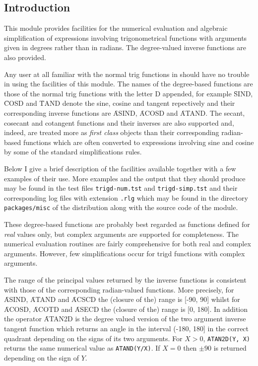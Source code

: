 
 
\subsection{Introduction}
This module provides facilities for the numerical evaluation and algebraic simplification of expressions involving  trigonometrical functions with arguments given in degrees rather than in radians.  The degree-valued inverse functions are also provided.  

Any user at all familiar with the normal trig functions in {\REDUCE} should have no trouble in using the facilities of this module.  The names of the degree-based functions are those of the normal trig functions with the letter D appended, for example \f{SIND}, \f{COSD} and \f{TAND} denote the sine, cosine and tangent repectively and their corresponding inverse functions are \f{ASIND}, \f{ACOSD} and \f{ATAND}.  The secant, cosecant and cotangent functions and their inverses are also supported and, indeed, are treated more as \textit{first class} objects than their corresponding radian-based functions which are often converted to expressions involving sine and cosine by some of the standard {\REDUCE} simplifications rules.   

Below I give a brief description of the facilities available together with a few examples of their use.  More examples and the output that they should produce may be found in the test files \texttt{trigd-num.tst} and \texttt{trigd-simp.tst} and their corresponding log files with extension \texttt{.rlg} which may be found in the directory \texttt{packages/misc} of the {\REDUCE} distribution along with the source code of the module.

These degree-based functions are probably best regarded as functions defined for {\em real} values only, but  complex arguments  are supported for completeness.  The numerical evaluation routines are fairly comprehensive for both real and complex arguments.
However, few simplifications occur for trigd functions with complex arguments.

The range of the principal values returned by the inverse functions is consistent with those of the corresponding radian-valued functions. More precisely, for \f{ASIND}, \f{ATAND} and  \f{ACSCD}  the (closure of the) range is [-90, 90] whilst for \f{ACOSD}, \f{ACOTD} and  \f{ASECD}  the (closure of the) range is [0, 180].  In addition the operator \f{ATAN2D} is the degree valued version of the two argument inverse tangent function which returns an angle in the interval (-180, 180] in the correct quadrant depending on the signs of its two arguments.  For $X>0$,  \texttt{ATAN2D(Y, X)} returns the same numerical value as  \texttt{ATAND(Y/X)}. If $X=0$ then $\pm 90$ is returned depending on the sign of $Y$.

